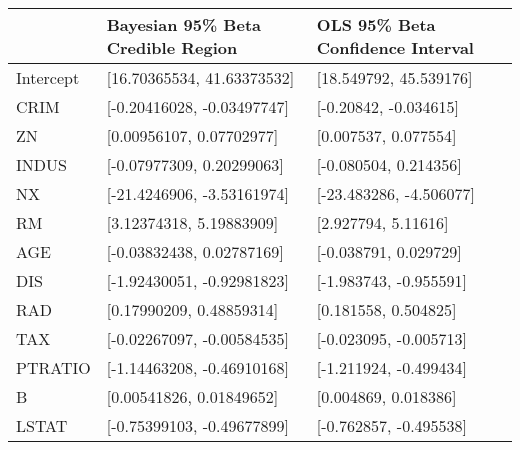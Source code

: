 \begin{tabular}{lll}
\hline
           & Bayesian 95\% Beta Credible Region   & OLS 95\% Beta Confidence Interval   \\
\hline
 Intercept & [16.70365534, 41.63373532]          & [18.549792, 45.539176]             \\
 CRIM      & [-0.20416028, -0.03497747]          & [-0.20842, -0.034615]              \\
 ZN        & [0.00956107, 0.07702977]            & [0.007537, 0.077554]               \\
 INDUS     & [-0.07977309, 0.20299063]           & [-0.080504, 0.214356]              \\
 NX        & [-21.4246906, -3.53161974]          & [-23.483286, -4.506077]            \\
 RM        & [3.12374318, 5.19883909]            & [2.927794, 5.11616]                \\
 AGE       & [-0.03832438, 0.02787169]           & [-0.038791, 0.029729]              \\
 DIS       & [-1.92430051, -0.92981823]          & [-1.983743, -0.955591]             \\
 RAD       & [0.17990209, 0.48859314]            & [0.181558, 0.504825]               \\
 TAX       & [-0.02267097, -0.00584535]          & [-0.023095, -0.005713]             \\
 PTRATIO   & [-1.14463208, -0.46910168]          & [-1.211924, -0.499434]             \\
 B         & [0.00541826, 0.01849652]            & [0.004869, 0.018386]               \\
 LSTAT     & [-0.75399103, -0.49677899]          & [-0.762857, -0.495538]             \\
\hline
\end{tabular}
